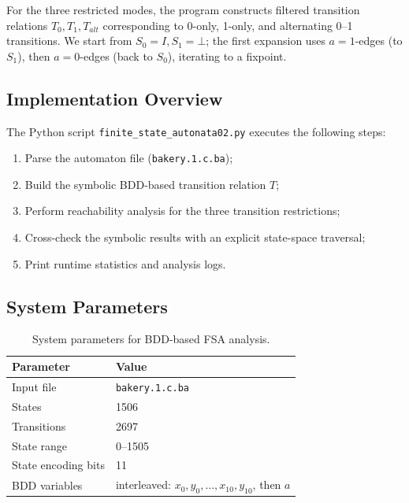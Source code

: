 \documentclass{article}
\begin{document}
For the three restricted modes, the program constructs filtered transition relations
\(T_0, T_1, T_{alt}\)
corresponding to 0-only, 1-only, and alternating 0–1 transitions.
We start from $S_0 = I, S_1 = \bot$; the first expansion uses $a = 1$-edges (to $S_1$),
then $a = 0$-edges (back to $S_0$), iterating to a fixpoint.




\subsection*{Implementation Overview}

The Python script \texttt{finite\_state\_autonata02.py} executes the following steps:

\begin{enumerate}
  \item Parse the automaton file (\texttt{bakery.1.c.ba});
  \item Build the symbolic BDD-based transition relation \(T\);
  \item Perform reachability analysis for the three transition restrictions;
  \item Cross-check the symbolic results with an explicit state-space traversal;
  \item Print runtime statistics and analysis logs.
\end{enumerate}



\subsection*{System Parameters}

\begin{table}[h]
\centering
\begin{tabular}{l|l}
\textbf{Parameter} & \textbf{Value} \\\hline
Input file & \texttt{bakery.1.c.ba} \\
States & 1506 \\
Transitions & 2697 \\
State range & 0--1505 \\
State encoding bits & 11 \\
BDD variables & interleaved: $x_0,y_0,\dots,x_{10},y_{10}$, then $a$ \\

\end{tabular}
\caption{System parameters for BDD-based FSA analysis.}
\end{table}
\end{document}
